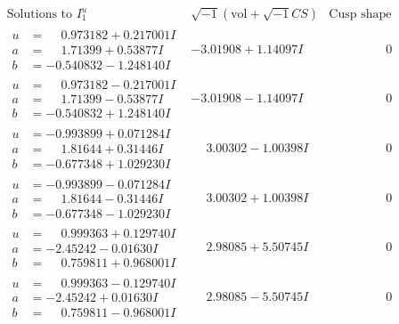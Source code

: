 \documentclass[1p]{elsarticle_modified}
\theoremstyle{definition}
\newcommand{\I}{\sqrt{-1}}
\begin{document}
$$\begin{array}{c|c|c}  
\text{Solutions to }I^u_{1}& \I (\text{vol} + \sqrt{-1}CS) & \text{Cusp shape}\\
 \hline 
\begin{aligned}
u &= \phantom{-}0.973182 + 0.217001 I \\
a &= \phantom{-}1.71399 + 0.53877 I \\
b &= -0.540832 - 1.248140 I\end{aligned}
 & -3.01908 + 1.14097 I & \phantom{-0.000000 } 0 \\ \hline\begin{aligned}
u &= \phantom{-}0.973182 - 0.217001 I \\
a &= \phantom{-}1.71399 - 0.53877 I \\
b &= -0.540832 + 1.248140 I\end{aligned}
 & -3.01908 - 1.14097 I & \phantom{-0.000000 } 0 \\ \hline\begin{aligned}
u &= -0.993899 + 0.071284 I \\
a &= \phantom{-}1.81644 + 0.31446 I \\
b &= -0.677348 + 1.029230 I\end{aligned}
 & \phantom{-}3.00302 - 1.00398 I & \phantom{-0.000000 } 0 \\ \hline\begin{aligned}
u &= -0.993899 - 0.071284 I \\
a &= \phantom{-}1.81644 - 0.31446 I \\
b &= -0.677348 - 1.029230 I\end{aligned}
 & \phantom{-}3.00302 + 1.00398 I & \phantom{-0.000000 } 0 \\ \hline\begin{aligned}
u &= \phantom{-}0.999363 + 0.129740 I \\
a &= -2.45242 - 0.01630 I \\
b &= \phantom{-}0.759811 + 0.968001 I\end{aligned}
 & \phantom{-}2.98085 + 5.50745 I & \phantom{-0.000000 } 0 \\ \hline\begin{aligned}
u &= \phantom{-}0.999363 - 0.129740 I \\
a &= -2.45242 + 0.01630 I \\
b &= \phantom{-}0.759811 - 0.968001 I\end{aligned}
 & \phantom{-}2.98085 - 5.50745 I & \phantom{-0.000000 } 0 \\ \hline\begin{aligned}

\end{aligned}
\end{array}$$
\end{document}
